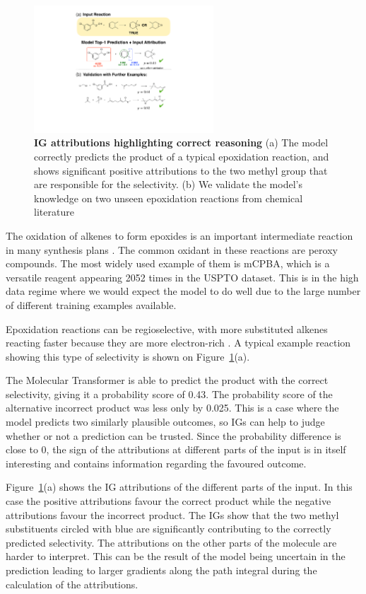 \begin{figure}[ht!]
    \centering
    \includegraphics[width=0.6\textwidth]{Chapters/Transformer/Figs/epoxidation.pdf}
    \caption{\label{fig:epoxide} \textbf{IG attributions highlighting correct reasoning} (a) The model correctly predicts the product of a typical epoxidation reaction, and shows significant positive attributions to the two methyl group that are responsible for the selectivity. (b) We validate the model's knowledge on two unseen epoxidation reactions from chemical literature~\cite{Lluch1993}}
\end{figure}

The oxidation of alkenes to form epoxides is an important intermediate reaction in many synthesis plans \cite{Clayden2012}. The common oxidant in these reactions are peroxy compounds. The most widely used example of them is mCPBA, which is a versatile reagent appearing 2052 times in the USPTO dataset. This is in the high data regime where we would expect the model to do well due to the large number of different training examples available. 

Epoxidation reactions can be regioselective, with more substituted alkenes reacting faster because they are more electron-rich \cite{Clayden2012}. A typical example reaction showing this type of selectivity is shown on Figure~\ref{fig:epoxide}(a). 

The Molecular Transformer is able to predict the product with the correct selectivity, giving it a probability score of 0.43. The probability score of the alternative incorrect product was less only by 0.025. This is a case where the model predicts two similarly plausible outcomes, so IGs can help to judge whether or not a prediction can be trusted. Since the probability difference is close to 0, the sign of the attributions at different parts of the input is in itself interesting and contains information regarding the favoured outcome. 

Figure~\ref{fig:epoxide}(a) shows the IG attributions of the different parts of the input.  In this case the positive attributions favour the correct product while the negative attributions favour the incorrect product. The IGs show that the two methyl substituents circled with blue are significantly contributing to the correctly predicted selectivity. The attributions on the other parts of the molecule are harder to interpret. This can be the result of the model being uncertain in the prediction leading to larger gradients along the path integral during the calculation of the attributions. 

